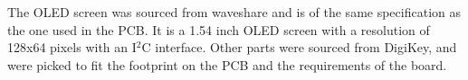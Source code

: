 \documentclass{article}
\begin{document}
The OLED screen was sourced from waveshare and is of the same specification as the one used in the PCB. It is a 1.54 inch OLED screen with a resolution of 128x64 pixels with an I$^2$C interface. Other parts were sourced from DigiKey, and were picked to fit the footprint on the PCB and the requirements of the board.


 






\end{document}
